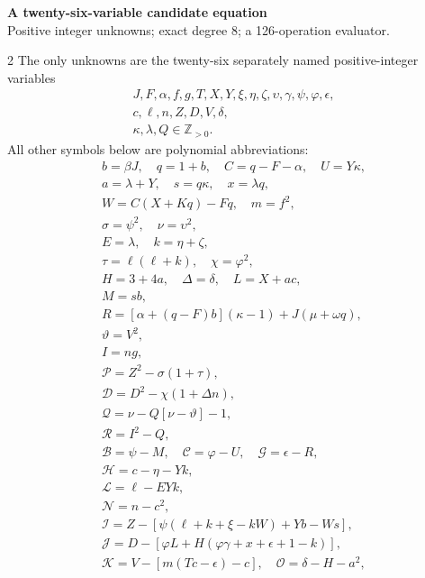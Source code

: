 \documentclass[10pt]{article}
\begin{document}
\begin{center}
{\large\bfseries A twenty-six-variable candidate equation}\\[-1pt]
{\small Positive integer unknowns; exact degree 8; a 126-operation evaluator.}
\end{center}\vspace{-8pt}
\begin{multicols}{2}
\fontsize{8.6}{9.1}\selectfont
The only unknowns are the twenty-six separately named positive-integer variables
\[
\begin{gathered}J,F,\alpha,f,g,T,X,Y,\xi,\eta,\zeta,\upsilon,\gamma,\psi,\varphi,\epsilon,\\
c,\ell,n,Z,D,V,\delta,\\
\kappa,\lambda,Q\in\mathbb Z_{>0}.\end{gathered}
\]
All other symbols below are polynomial abbreviations:
\[
\begin{gathered}
b=\beta J,\quad q=1+b,\quad C=q-F-\alpha,\quad U=Y\kappa,\\
a=\lambda+Y,\quad s=q\kappa,\quad x=\lambda q,\\
W=C(X+Kq)-Fq,\quad m=f^2,\\
\sigma=\psi^2,\quad\nu=\upsilon^2,\\
E=\lambda,\quad k=\eta+\zeta,\\
\tau=\ell(\ell+k),\quad\chi=\varphi^2,\\
H=3+4a,\quad\Delta=\delta,\quad L=X+ac,\\
M=sb,\\
R=[\alpha+(q-F)b](\kappa-1)+J(\mu+\omega q),\\
\vartheta=V^2,\\
I=ng,\\
\mathcal{P}=Z^2-\sigma(1+\tau),\\
\mathcal{D}=D^2-\chi(1+\Delta n),\\
\mathcal{Q}=\nu-Q[\nu-\vartheta]-1,\\
\mathcal{R}=I^2-Q,\\
\mathcal{B}=\psi-M,\quad \mathcal{C}=\varphi-U,\quad \mathcal{G}=\epsilon-R,\\
\mathcal{H}=c-\eta-Yk,\\
\mathcal{L}=\ell-EYk,\\
\mathcal{N}=n-c^2,\\
\mathcal{I}=Z-[\psi(\ell+k+\xi-kW)+Yb-Ws],\\
\mathcal{J}=D-[\varphi L+H(\varphi\gamma+x+\epsilon+1-k)],\\
\mathcal{K}=V-[m(Tc-\epsilon)-c],\quad\mathcal{O}=\delta-H-a^2,\\

\end{gathered}\]
\end{multicols}
\end{document}
